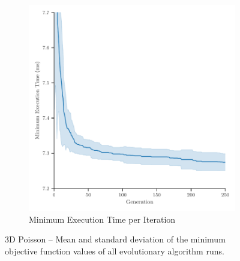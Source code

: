 \begin{figure}
\begin{subfigure}[b]{0.49\textwidth}
		\includegraphics[width=\textwidth]{figures/minimum_execution_time_3D_FD_Poisson_fromL2.pdf}
		\caption{Minimum Execution Time per Iteration}
		\label{fig:poisson-3D-minimum-execution-time}
	\end{subfigure}
	\caption[3D Poisson -- Mean and standard deviation of the minimum objective function values]{3D Poisson -- Mean and standard deviation of the minimum objective function values of all evolutionary algorithm runs.}
	\label{fig:poisson-3D-minimum-objectives}
\end{figure}
